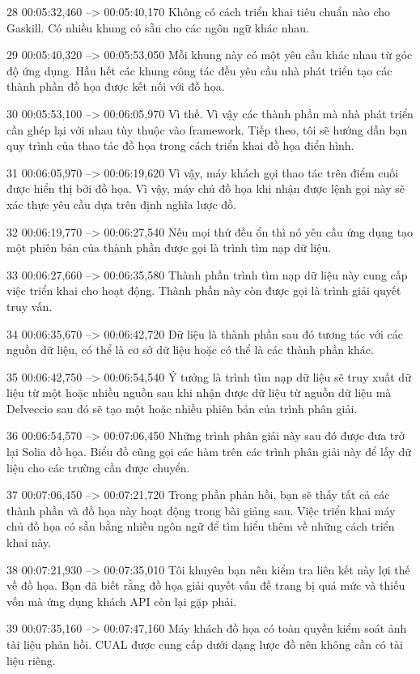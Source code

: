 28
00:05:32,460 --> 00:05:40,170
Không có cách triển khai tiêu chuẩn nào cho Gaskill.  Có nhiều khung có sẵn cho các ngôn ngữ khác nhau.

29
00:05:40,320 --> 00:05:53,050
Mỗi khung này có một yêu cầu khác nhau từ góc độ ứng dụng.  Hầu hết các khung công tác đều yêu cầu nhà phát triển tạo các thành phần đồ họa được kết nối với đồ họa.

30
00:05:53,100 --> 00:06:05,970
Vì thế.  Vì vậy các thành phần mà nhà phát triển cần ghép lại với nhau tùy thuộc vào framework.  Tiếp theo, tôi sẽ hướng dẫn bạn quy trình của thao tác đồ họa trong cách triển khai đồ họa điển hình.

31
00:06:05,970 --> 00:06:19,620
Vì vậy, máy khách gọi thao tác trên điểm cuối được hiển thị bởi đồ họa.  Vì vậy, máy chủ đồ họa khi nhận được lệnh gọi này sẽ xác thực yêu cầu dựa trên định nghĩa lược đồ.

32
00:06:19,770 --> 00:06:27,540
Nếu mọi thứ đều ổn thì nó yêu cầu ứng dụng tạo một phiên bản của thành phần được gọi là trình tìm nạp dữ liệu.

33
00:06:27,660 --> 00:06:35,580
Thành phần trình tìm nạp dữ liệu này cung cấp việc triển khai cho hoạt động.  Thành phần này còn được gọi là trình giải quyết truy vấn.

34
00:06:35,670 --> 00:06:42,720
Dữ liệu là thành phần sau đó tương tác với các nguồn dữ liệu, có thể là cơ sở dữ liệu hoặc có thể là các thành phần khác.

35
00:06:42,750 --> 00:06:54,540
Ý tưởng là trình tìm nạp dữ liệu sẽ truy xuất dữ liệu từ một hoặc nhiều nguồn sau khi nhận được dữ liệu từ nguồn dữ liệu mà Delveccio sau đó sẽ tạo một hoặc nhiều phiên bản của trình phân giải.

36
00:06:54,570 --> 00:07:06,450
Những trình phân giải này sau đó được đưa trở lại Solia đồ họa.  Biểu đồ cũng gọi các hàm trên các trình phân giải này để lấy dữ liệu cho các trường cần được chuyển.

37
00:07:06,450 --> 00:07:21,720
Trong phần phản hồi, bạn sẽ thấy tất cả các thành phần và đồ họa này hoạt động trong bài giảng sau.  Việc triển khai máy chủ đồ họa có sẵn bằng nhiều ngôn ngữ để tìm hiểu thêm về những cách triển khai này.

38
00:07:21,930 --> 00:07:35,010
Tôi khuyên bạn nên kiểm tra liên kết này lợi thế về đồ họa.  Bạn đã biết rằng đồ họa giải quyết vấn đề trang bị quá mức và thiếu vốn mà ứng dụng khách API còn lại gặp phải.

39
00:07:35,160 --> 00:07:47,160
Máy khách đồ họa có toàn quyền kiểm soát ảnh tài liệu phản hồi.  CUAL được cung cấp dưới dạng lược đồ nên không cần có tài liệu riêng.

